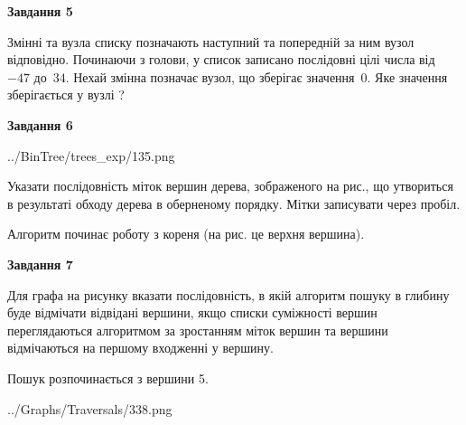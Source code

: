 \documentclass[12pt, ukrainian]{article}
\begin{document}
{\begin {large}
{\begin {center}\textbf{Завдання 5}\end {center}}\par
Змінні  та  вузла списку позначають наступний та попередній за ним вузол відповідно. Починаючи з голови, у список записано послідовні цілі числа від~$-47$ до~$34$. Нехай змінна  позначає вузол, що зберігає значення~$0$.
Яке значення зберігається у вузлі  ?\par
\newpage

{\begin {center}\textbf{Завдання 6}\end {center}}\par

\begin{center}
	{../BinTree/trees_exp/135.png}
\end{center}
Указати послідовність міток вершин дерева, зображеного на рис., що утвориться в результаті обходу дерева в оберненому порядку. Мітки записувати через пробіл.\par Алгоритм починає роботу з кореня (на рис. це верхня вершина).\par
\newpage

{\begin {center}\textbf{Завдання 7}\end {center}}\par
Для графа на рисунку вказати послідовність, в якій алгоритм пошуку в глибину буде відмічати відвідані вершини, якщо списки суміжності вершин переглядаються алгоритмом за зростанням міток вершин та вершини відмічаються на першому вход\-женні у вершину.\par
Пошук розпочинається з вершини 5.\par

\begin{center}
	{../Graphs/Traversals/338.png}
\end{center}\par
\newpage


\end{large}}
\end{document}
